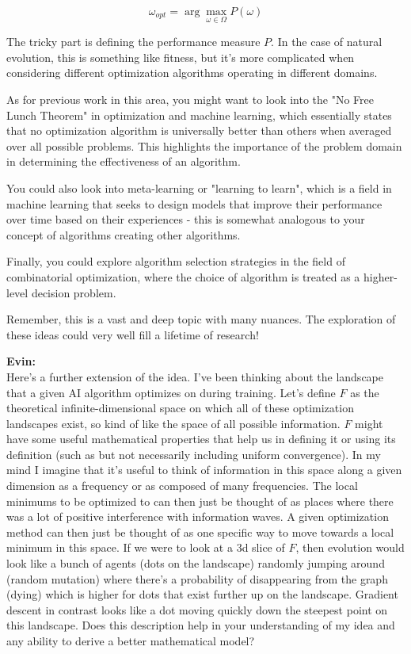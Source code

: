 \documentclass{article}[10pt]
\begin{document}
\[
\omega_{opt} = \arg\max_{\omega \in \Omega} P(\omega)
\]

The tricky part is defining the performance measure \( P \). 
In the case of natural evolution, this is something like fitness, but it's more complicated when considering different optimization algorithms operating in different domains.\par

As for previous work in this area, you might want to look into the "No Free Lunch Theorem" in optimization and machine learning, which essentially states that no optimization algorithm is universally better than others when averaged over all possible problems. 
This highlights the importance of the problem domain in determining the effectiveness of an algorithm.\par

You could also look into meta-learning or "learning to learn", which is a field in machine learning that seeks to design models that improve their performance over time based on their experiences - this is somewhat analogous to your concept of algorithms creating other algorithms.\par

Finally, you could explore algorithm selection strategies in the field of combinatorial optimization, where the choice of algorithm is treated as a higher-level decision problem.\par

Remember, this is a vast and deep topic with many nuances. The exploration of these ideas could very well fill a lifetime of research!\par


\noindent \textbf{Evin:}\\
Here's a further extension of the idea. 
I've been thinking about the landscape that a given AI algorithm optimizes on during training. 
Let's define $F$ as the theoretical infinite-dimensional space on which all of these optimization landscapes exist, so kind of like the space of all possible information. 
$F$ might have some useful mathematical properties that help us in defining it or using its definition (such as but not necessarily including uniform convergence). 
In my mind I imagine that it's useful to think of information in this space along a given dimension as a frequency or as composed of many frequencies. 
The local minimums to be optimized to can then just be thought of as places where there was a lot of positive interference with information waves. 
A given optimization method can then just be thought of as one specific way to move towards a local minimum in this space. 
If we were to look at a 3d slice of $F$, then evolution would look like a bunch of agents (dots on the landscape) randomly jumping around (random mutation) where there's a probability of disappearing from the graph (dying) which is higher for dots that exist further up on the landscape. 
Gradient descent in contrast looks like a dot moving quickly down the steepest point on this landscape. 
Does this description help in your understanding of my idea and any ability to derive a better mathematical model?\par
\end{document}
